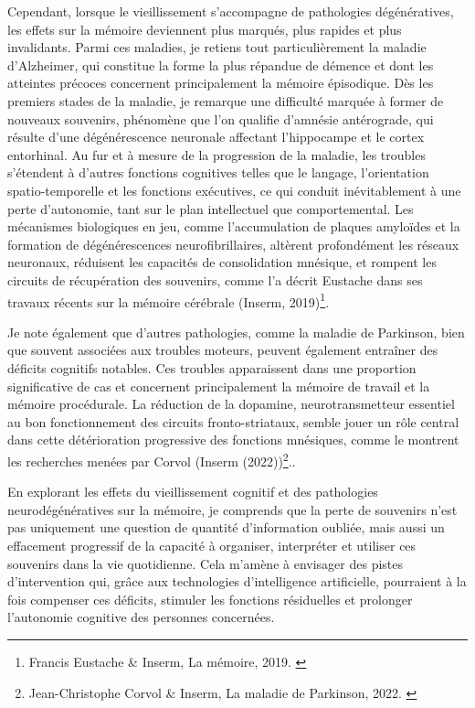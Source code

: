 \documentclass[11pt,a4paper]{report}
\begin{document}
Cependant, lorsque le vieillissement s’accompagne de pathologies dégénératives, les effets sur la mémoire deviennent plus marqués, plus rapides et plus invalidants. Parmi ces maladies, je retiens tout particulièrement la maladie d’Alzheimer, qui constitue la forme la plus répandue de démence et dont les atteintes précoces concernent principalement la mémoire épisodique. Dès les premiers stades de la maladie, je remarque une difficulté marquée à former de nouveaux souvenirs, phénomène que l’on qualifie d’amnésie antérograde, qui résulte d’une dégénérescence neuronale affectant l’hippocampe et le cortex entorhinal. Au fur et à mesure de la progression de la maladie, les troubles s’étendent à d’autres fonctions cognitives telles que le langage, l’orientation spatio-temporelle et les fonctions exécutives, ce qui conduit inévitablement à une perte d’autonomie, tant sur le plan intellectuel que comportemental. Les mécanismes biologiques en jeu, comme l’accumulation de plaques amyloïdes et la formation de dégénérescences neurofibrillaires, altèrent profondément les réseaux neuronaux, réduisent les capacités de consolidation mnésique, et rompent les circuits de récupération des souvenirs, comme l’a décrit Eustache dans ses travaux récents sur la mémoire cérébrale (Inserm, 2019)\footnote{Francis Eustache \& Inserm, La mémoire, 2019. \cite{inserm}}.

Je note également que d’autres pathologies, comme la maladie de Parkinson, bien que souvent associées aux troubles moteurs, peuvent également entraîner des déficits cognitifs notables. Ces troubles apparaissent dans une proportion significative de cas et concernent principalement la mémoire de travail et la mémoire procédurale. La réduction de la dopamine, neurotransmetteur essentiel au bon fonctionnement des circuits fronto-striataux, semble jouer un rôle central dans cette détérioration progressive des fonctions mnésiques, comme le montrent les recherches menées par Corvol (Inserm (2022))\footnote{Jean-Christophe Corvol \& Inserm, La maladie de Parkinson, 2022. \cite{inserm2}}..

En explorant les effets du vieillissement cognitif et des pathologies neurodégénératives sur la mémoire, je comprends que la perte de souvenirs n’est pas uniquement une question de quantité d’information oubliée, mais aussi un effacement progressif de la capacité à organiser, interpréter et utiliser ces souvenirs dans la vie quotidienne. Cela m’amène à envisager des pistes d’intervention qui, grâce aux technologies d’intelligence artificielle, pourraient à la fois compenser ces déficits, stimuler les fonctions résiduelles et prolonger l’autonomie cognitive des personnes concernées.
\end{document}
